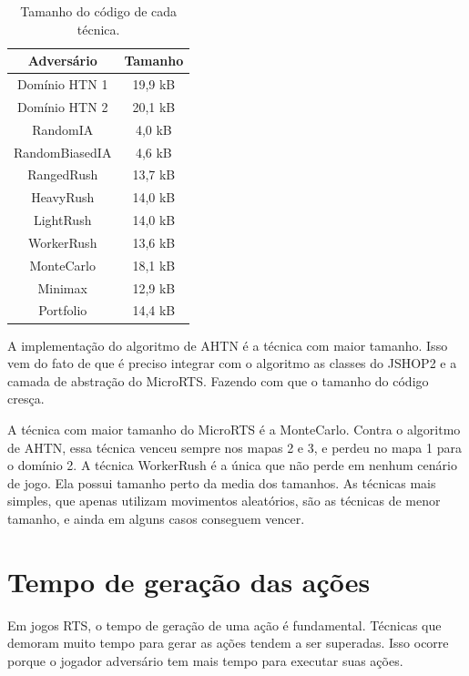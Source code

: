 \begin{table}[ht]
	\centering
	\caption{Tamanho do código de cada técnica.}
	\label{tab:tamanho}
	\begin{tabular}{|c|c|}
		\hline
		\textbf{Adversário}     & \textbf{Tamanho} \\ \hline
		Domínio HTN 1           & 19,9 kB          \\ \hline
		Domínio HTN 2           & 20,1 kB          \\ \hline
		RandomIA                & 4,0 kB           \\ \hline
		RandomBiasedIA          & 4,6 kB           \\ \hline
		RangedRush              & 13,7 kB          \\ \hline
		HeavyRush               & 14,0 kB          \\ \hline
		LightRush               & 14,0 kB          \\ \hline
		WorkerRush              & 13,6 kB          \\ \hline
		MonteCarlo              & 18,1 kB          \\ \hline
		Minimax                 & 12,9 kB          \\ \hline
		Portfolio               & 14,4 kB          \\ \hline
	\end{tabular}
\end{table}

A implementação do algoritmo de AHTN é a técnica com maior tamanho.
Isso vem do fato de que é preciso integrar com o algoritmo as classes do JSHOP2 e a camada de abstração do MicroRTS.
Fazendo com que o tamanho do código cresça.

A técnica com maior tamanho do MicroRTS é a MonteCarlo.
Contra o algoritmo de AHTN, essa técnica venceu sempre nos mapas 2 e 3, e perdeu no mapa 1 para o domínio 2.
A técnica WorkerRush é a única que não perde em nenhum cenário de jogo.
Ela possui tamanho perto da media dos tamanhos.
As técnicas mais simples, que apenas utilizam movimentos aleatórios, são as técnicas de menor tamanho, e ainda em alguns casos conseguem vencer.

\section{Tempo de geração das ações}

Em jogos RTS, o tempo de geração de uma ação é fundamental.
Técnicas que demoram muito tempo para gerar as ações tendem a ser superadas.
Isso ocorre porque o jogador adversário tem mais tempo para executar suas ações.

